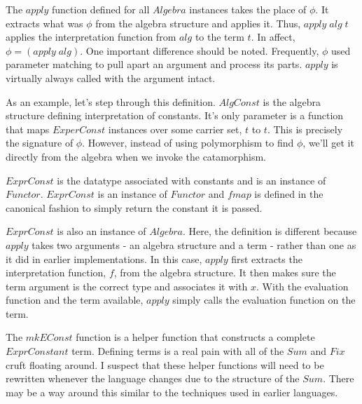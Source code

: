 \documentclass[10pt]{article}
\newcommand{\Conid}[1]{\mathit{#1}}
\newcommand{\Varid}[1]{\mathit{#1}}
\begin{document}
The \ensuremath{\Varid{apply}} function defined for all \ensuremath{\Conid{Algebra}} instances takes the
place of \ensuremath{\Varid{\phi}}.  It extracts what was \ensuremath{\Varid{\phi}} from the algebra structure
and applies it.  Thus, \ensuremath{\Varid{apply}\;\Varid{alg}\;\Varid{t}} applies the interpretation
function from \ensuremath{\Varid{alg}} to the term \ensuremath{\Varid{t}}.  In affect, \ensuremath{\Varid{\phi}\mathrel{=}(\Varid{apply}\;\Varid{alg})}.
One important difference should be noted.  Frequently, \ensuremath{\Varid{\phi}} used
parameter matching to pull apart an argument and process its parts.
\ensuremath{\Varid{apply}} is virtually always called with the argument intact.

As an example, let's step through this definition.  \ensuremath{\Conid{AlgConst}} is the
algebra structure defining interpretation of constants.  It's only
parameter is a function that maps \ensuremath{\Conid{ExperConst}} instances over some
carrier set, \ensuremath{\Varid{t}} to \ensuremath{\Varid{t}}.  This is precisely the signature of \ensuremath{\Varid{\phi}}.
However, instead of using polymorphism to find \ensuremath{\Varid{\phi}}, we'll get it
directly from the algebra when we invoke the catamorphism.

\ensuremath{\Conid{ExprConst}} is the datatype associated with constants and is an
instance of \ensuremath{\Conid{Functor}}.  \ensuremath{\Conid{ExprConst}} is an instance of \ensuremath{\Conid{Functor}} and
\ensuremath{\Varid{fmap}} is defined in the canonical fashion to simply return the
constant it is passed.

\ensuremath{\Conid{ExprConst}} is also an instance of \ensuremath{\Conid{Algebra}}.  Here, the definition is
different because \ensuremath{\Varid{apply}} takes two arguments - an algebra structure
and a term - rather than one as it did in earlier implementations.  In
this case, \ensuremath{\Varid{apply}} first extracts the interpretation function, \ensuremath{\Varid{f}},
from the algebra structure.  It then makes sure the term argument is
the correct type and associates it with \ensuremath{\Varid{x}}. With the evaluation
function and the term available, \ensuremath{\Varid{apply}} simply calls the
evaluation function on the term.

The \ensuremath{\Varid{mkEConst}} function is a helper function that constructs a
complete \ensuremath{\Conid{ExprConstant}} term.  Defining terms is a real pain with all
of the \ensuremath{\Conid{Sum}} and \ensuremath{\Conid{Fix}} cruft floating around.  I suspect that these
helper functions will need to be rewritten whenever the language
changes due to the structure of the \ensuremath{\Conid{Sum}}.  There may be a way around
this similar to the techniques used in earlier languages.
\end{document}
